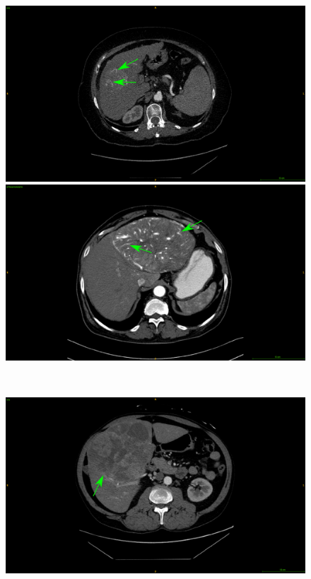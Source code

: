 \documentclass[]{article}
\begin{document}
\begin{figure}[!ht]
	\centering
	\begin{minipage}{0.45\linewidth}
		\includegraphics[width=\linewidth]{../Contributions/images/ImagingTraits/ResizeGDB_internalArteries}
	\end{minipage} \hspace{-0.1cm}
	\begin{minipage}{0.45\linewidth}
		\includegraphics[width=\linewidth]{../Contributions/images/ImagingTraits/ResizeTCIA_internalArteries}
	\end{minipage} \\
	\begin{minipage}{0.45\linewidth}
		\includegraphics[width=\linewidth]{../Contributions/images/ImagingTraits/ResizeGDB_texturalHeterogeneity}

\end{minipage}
\end{figure}
\end{document}

